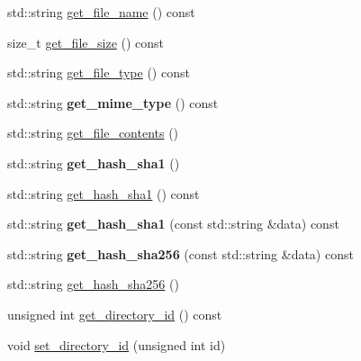 \begin{DoxyCompactItemize}
std\+::string \hyperlink{class_vessel_1_1_file_1_1_backup_file_ace86a0294d9ec4c1c5fb547faa5a62f1}{get\+\_\+file\+\_\+name} () const
\item 
size\+\_\+t \hyperlink{class_vessel_1_1_file_1_1_backup_file_a0b803c1b83538be4cd6f8b68325ce040}{get\+\_\+file\+\_\+size} () const
\item 
std\+::string \hyperlink{class_vessel_1_1_file_1_1_backup_file_ac8c6bd1d97350bfff857a4d2ac66a705}{get\+\_\+file\+\_\+type} () const
\item 
\mbox{\label{class_vessel_1_1_file_1_1_backup_file_ab22d34fcc6b8fa3b7b16ea4681b31d2c}} 
std\+::string {\bfseries get\+\_\+mime\+\_\+type} () const
\item 
std\+::string \hyperlink{class_vessel_1_1_file_1_1_backup_file_ac174329c938bd09c196e63a52540e33b}{get\+\_\+file\+\_\+contents} ()
\item 
\mbox{\label{class_vessel_1_1_file_1_1_backup_file_ac30eea3eb40d059a325627f8ff01bfe2}} 
std\+::string {\bfseries get\+\_\+hash\+\_\+sha1} ()
\item 
std\+::string \hyperlink{class_vessel_1_1_file_1_1_backup_file_a88f93dc773a3b2e81ca44f425ecba64a}{get\+\_\+hash\+\_\+sha1} () const
\item 
\mbox{\label{class_vessel_1_1_file_1_1_backup_file_a4e8831f4e19ac25219ca232cf3718be9}} 
std\+::string {\bfseries get\+\_\+hash\+\_\+sha1} (const std\+::string \&data) const
\item 
\mbox{\label{class_vessel_1_1_file_1_1_backup_file_a09d660faba0aec8c9b8e28af40481dce}} 
std\+::string {\bfseries get\+\_\+hash\+\_\+sha256} (const std\+::string \&data) const
\item 
std\+::string \hyperlink{class_vessel_1_1_file_1_1_backup_file_ab7c424cc0644011f0d86bdd1475a5986}{get\+\_\+hash\+\_\+sha256} ()
\item 
unsigned int \hyperlink{class_vessel_1_1_file_1_1_backup_file_a720b6578b0c1fe64fb3edd391b006de9}{get\+\_\+directory\+\_\+id} () const
\item 
\mbox{\label{class_vessel_1_1_file_1_1_backup_file_a71d2aa2d423fda9336cba07f063552f6}} 
void \hyperlink{class_vessel_1_1_file_1_1_backup_file_a71d2aa2d423fda9336cba07f063552f6}{set\+\_\+directory\+\_\+id} (unsigned int id)

\end{DoxyCompactItemize}
